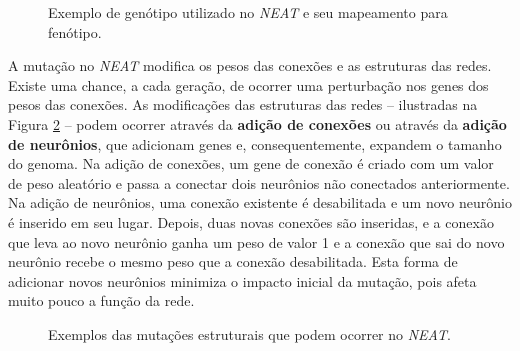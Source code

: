 \begin{figure}[H]
\centering
{}
\caption {\label{fig:neat-genomes}Exemplo de genótipo utilizado no
\textit{NEAT} e seu mapeamento para fenótipo.}
\end{figure}

A mutação no \textit{NEAT} modifica os pesos das conexões e as estruturas das
redes. Existe uma chance, a cada geração, de ocorrer uma perturbação nos genes
dos pesos das conexões. As modificações das estruturas das redes -- ilustradas
na Figura \ref{fig:neat-structural-mutation} -- podem ocorrer através da
\textbf{adição de conexões} ou através da \textbf{adição de neurônios}, que
adicionam genes e, consequentemente, expandem o tamanho do genoma. Na adição de
conexões, um gene de conexão é criado com um valor de peso aleatório e passa a
conectar dois neurônios não conectados anteriormente. Na adição de neurônios,
uma conexão existente é desabilitada e um novo neurônio é inserido em seu lugar.
Depois, duas novas conexões são inseridas, e a conexão que leva ao novo neurônio
ganha um peso de valor 1 e a conexão que sai do novo neurônio recebe o mesmo
peso que a conexão desabilitada. Esta forma de adicionar novos neurônios
minimiza o impacto inicial da mutação, pois afeta muito pouco a função da rede.

\begin{figure}[H]
\centering
\caption {\label{fig:neat-structural-mutation}Exemplos das mutações estruturais
que podem ocorrer no \textit{NEAT}.}
\end{figure}

